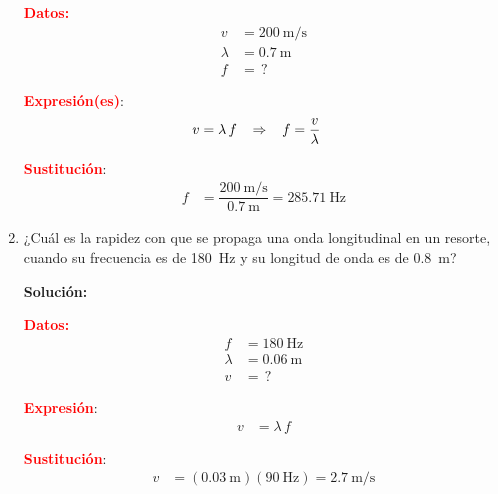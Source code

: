 \documentclass[14pt]{extarticle}
\newcommand{\textocolor}[2]{\textbf{\textcolor{#1}{#2}}}
\begin{document}
\begin{enumerate}
\begin{minipage}[t]{0.35\linewidth}
\noindent
\textocolor{red}{Datos:}
\begin{align*}
v &= \SI{200}{\meter\per\second} \\[0.5em]
\lambda &= \SI{0.7}{\meter} \\[0.5em]
f &= \, ?
\end{align*}
\end{minipage}
\hspace{1cm}
\begin{minipage}[t]{0.35\linewidth}
\noindent
\textocolor{red}{Expresión(es)}:
\begin{align*}
v &= \lambda \, f \hspace{0.3cm} \Rightarrow \hspace{0.3cm} f = \dfrac{v}{\lambda}
\end{align*}
\end{minipage}

\begin{minipage}{0.5\linewidth}
\noindent
\textocolor{red}{Sustitución}:
\begin{align*}
f &= \dfrac{\SI{200}{\meter\per\second}}{\SI{0.7}{\meter}} = \SI{285.71}{\hertz}
\end{align*}
\end{minipage}

\item ¿Cuál es la rapidez con que se propaga una onda longitudinal en un resorte, cuando su frecuencia es de \SI{180}{\hertz} y su longitud de onda es de \SI{0.8}{\meter}?

\textbf{Solución:}

\begin{minipage}[t]{0.35\linewidth}
\noindent
\textocolor{red}{Datos:}
\begin{align*}
f&= \SI{180}{\hertz} \\[0.5em]
\lambda &= \SI{0.06}{\meter} \\[0.5em]
v &= \, ?
\end{align*}
\end{minipage}
\hspace{1cm}
\begin{minipage}[t]{0.35\linewidth}
\noindent
\textocolor{red}{Expresión}:
\begin{align*}
v &= \lambda \, f    
\end{align*}
\end{minipage}

\begin{minipage}{0.5\linewidth}
\noindent
\textocolor{red}{Sustitución}:
\begin{align*}
v &= (\SI{0.03}{\meter})(\SI{90}{\hertz}) = \SI{2.7}{\meter\per\second}
\end{align*}
\end{minipage}


\end{enumerate}
\end{document}
